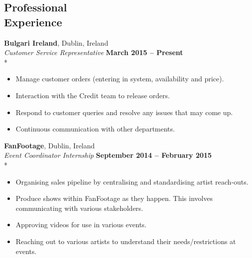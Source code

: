 \documentclass[margin,line]{resume}
\begin{document}
\begin{resume}

    \section{\mysidestyle Professional\\Experience}  
    \textbf{Bulgari Ireland}, Dublin, Ireland \vspace{2mm}\\\vspace{1mm}%
    \textsl{Customer Service Representative} \hfill \textbf{March 2015 -- Present}\\*
    \begin{itemize}
    \item Manage customer orders (entering in system, availability and price). 
    \item Interaction with the Credit team to release orders. 
    \item Respond to customer queries and resolve any issues that may come up. 
    \item Continuous communication with other departments. 
    \end{itemize}       
      
    \textbf{FanFootage}, Dublin, Ireland \vspace{2mm}\\\vspace{1mm}%
    \textsl{Event Coordinator Internship} \hfill \textbf{September 2014 -- February 2015}\\*
    \begin{itemize}
    \item Organising sales pipeline by centralising and standardising artist reach-outs. 
    \item Produce shows within FanFootage as they happen. This involves communicating with various stakeholders. 
    \item Approving videos for use in various events. 
    \item Reaching out to various artists to understand their needs/restrictions at events. 
    \end{itemize}     
    

\end{resume}
\end{document}
